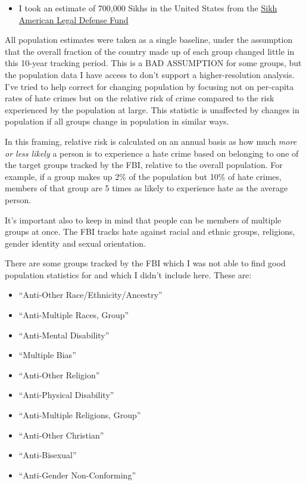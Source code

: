 \documentclass[
]{article}
\providecommand{\tightlist}{%
  \setlength{\itemsep}{0pt}\setlength{\parskip}{0pt}}
\begin{document}
\begin{itemize}
\tightlist
\item
  I took an estimate of 700,000 Sikhs in the United States from the
  \href{http://saldef.org/archive/learn-about-sikhs/\#.WaR7qyiGOM9}{Sikh
  American Legal Defense Fund}
\end{itemize}

All population estimates were taken as a single baseline, under the
assumption that the overall fraction of the country made up of each
group changed little in this 10-year tracking period. This is a BAD
ASSUMPTION for some groups, but the population data I have access to
don't support a higher-resolution analysis. I've tried to help correct
for changing population by focusing not on per-capita rates of hate
crimes but on the relative risk of crime compared to the risk
experienced by the population at large. This statistic is unaffected by
changes in population if all groups change in population in similar
ways.

In this framing, relative risk is calculated on an annual basis as how
much \emph{more or less likely} a person is to experience a hate crime
based on belonging to one of the target groups tracked by the FBI,
relative to the overall population. For example, if a group makes up 2\%
of the population but 10\% of hate crimes, members of that group are 5
times as likely to experience hate as the average person.

It's important also to keep in mind that people can be members of
multiple groups at once. The FBI tracks hate against racial and ethnic
groups, religions, gender identity and sexual orientation.

There are some groups tracked by the FBI which I was not able to find
good population statistics for and which I didn't include here. These
are:

\begin{itemize}
\tightlist
\item
  ``Anti-Other Race/Ethnicity/Ancestry''
\item
  ``Anti-Multiple Races, Group''
\item
  ``Anti-Mental Disability''
\item
  ``Multiple Bias''
\item
  ``Anti-Other Religion''
\item
  ``Anti-Physical Disability''
\item
  ``Anti-Multiple Religions, Group''
\item
  ``Anti-Other Christian''
\item
  ``Anti-Bisexual''
\item
  ``Anti-Gender Non-Conforming''
\end{itemize}
\end{document}

